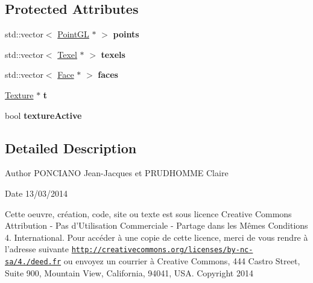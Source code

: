 \subsection*{Protected Attributes}
\begin{DoxyCompactItemize}
\item 
\hypertarget{classObjets_a626af9cb2c818f96ee1107162bc88db1}{std\-::vector$<$ \hyperlink{classPointGL}{Point\-G\-L} $\ast$ $>$ {\bfseries points}}\label{classObjets_a626af9cb2c818f96ee1107162bc88db1}

\item 
\hypertarget{classObjets_aa12179399b8fa417a47cf9399e5746b7}{std\-::vector$<$ \hyperlink{classTexel}{Texel} $\ast$ $>$ {\bfseries texels}}\label{classObjets_aa12179399b8fa417a47cf9399e5746b7}

\item 
\hypertarget{classObjets_aba91b138535fd2825b1616af8c22fe68}{std\-::vector$<$ \hyperlink{classFace}{Face} $\ast$ $>$ {\bfseries faces}}\label{classObjets_aba91b138535fd2825b1616af8c22fe68}

\item 
\hypertarget{classObjets_aaf5fb81127ec1fdfbea5187079bdc408}{\hyperlink{classTexture}{Texture} $\ast$ {\bfseries t}}\label{classObjets_aaf5fb81127ec1fdfbea5187079bdc408}

\item 
\hypertarget{classObjets_a6047da5af8aa69b393b76e10f16aaebf}{bool {\bfseries texture\-Active}}\label{classObjets_a6047da5af8aa69b393b76e10f16aaebf}

\end{DoxyCompactItemize}


\subsection{Detailed Description}
\begin{DoxyAuthor}{Author}
P\-O\-N\-C\-I\-A\-N\-O Jean-\/\-Jacques et P\-R\-U\-D\-H\-O\-M\-M\-E Claire 
\end{DoxyAuthor}
\begin{DoxyDate}{Date}
13/03/2014
\end{DoxyDate}
Cette oeuvre, création, code, site ou texte est sous licence Creative Commons Attribution -\/ Pas d’\-Utilisation Commerciale -\/ Partage dans les Mêmes Conditions 4. International. Pour accéder à une copie de cette licence, merci de vous rendre à l'adresse suivante \href{http://creativecommons.org/licenses/by-nc-sa/4.0/deed.fr}{\tt http\-://creativecommons.\-org/licenses/by-\/nc-\/sa/4./deed.\-fr} ou envoyez un courrier à Creative Commons, 444 Castro Street, Suite 900, Mountain View, California, 94041, U\-S\-A. Copyright 2014


